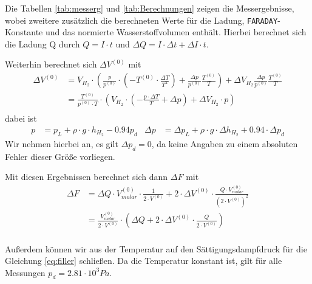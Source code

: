 \documentclass[10pt,a4paper]{article}
\begin{document}
\begin{flushleft}
Die Tabellen \ref{tab:messerg} und \ref{tab:Berechnungen} zeigen die Messergebnisse, wobei zweitere zusätzlich die berechneten Werte für die Ladung, \texttt{FARADAY}-Konstante und das normierte Wasserstoffvolumen enthält. Hierbei berechnet sich die Ladung Q durch $Q = I \cdot t$ und $\Delta Q = I \cdot \Delta t + \Delta I \cdot t$.

Weiterhin berechnet sich $\Delta V^{(0)}$ mit
\begin{align*}
\Delta V^{(0)} &= V_{H_2} \cdot \left(\frac{p}{p^{(0)}} \cdot \left(- T^{(0)} \cdot \frac{\Delta T}{T^2} \right) + \frac{\Delta p}{p^{(0)}} \frac{T^{(0)}}{T} \right) + \Delta	V_{H_2} \frac{\Delta p}{p^{(0)}} \frac{T^{(0)}}{T} \\
&= \frac{T^{(0)}}{p^{(0)} \cdot T} \cdot \left(V_{H_2} \cdot \left(- \frac{p \cdot \Delta T}{T} + \Delta p \right) + \Delta V_{H_2} \cdot p \right) \\
\end{align*}
dabei ist
\begin{align*}
p &= p_L + \rho \cdot g \cdot h_{H_2} - 0.94 p_d & \Delta p &= \Delta p_L + \rho \cdot g \cdot \Delta h_{H_2} + 0.94 \cdot \Delta p_d
\end{align*}
Wir nehmen hierbei an, es gilt $\Delta p_d = 0$, da keine Angaben zu einem absoluten Fehler dieser Größe vorliegen.

Mit diesen Ergebnissen berechnet sich dann $\Delta F$ mit
\begin{align*}
\Delta F &= \Delta Q \cdot V^{(0)}_{molar} \cdot \frac{1}{2 \cdot V^{(0)}} + 2 \cdot \Delta V^{(0)} \cdot \frac{Q \cdot V^{(0)}_{molar}}{(2 \cdot V^{(0)})^2} \\
&= \frac{V^{(0)}_{molar}}{2 \cdot V^{(0)}} \cdot \left(\Delta Q + 2 \cdot \Delta V^{(0)} \cdot \frac{Q}{2 \cdot V^{(0)}} \right) \\
\end{align*}

Außerdem können wir aus der Temperatur auf den Sättigungsdampfdruck für die Gleichung \ref{eq:filler} schließen. Da die Temperatur konstant ist, gilt für alle Messungen $p_d = 2.81 \cdot 10^{3} Pa$.
\end{flushleft}
\end{document}
